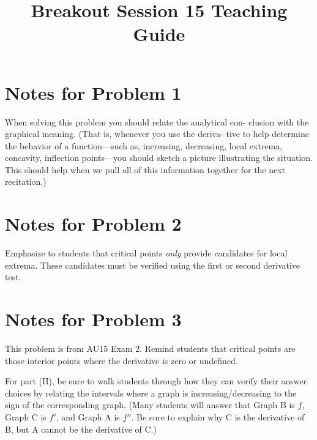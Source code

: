 \documentclass[nooutcomes]{ximera}
\title{Breakout Session 15 Teaching Guide}
\begin{document}
\begin{abstract}
\end{abstract}
\maketitle
\section{Notes for Problem 1}
When solving this problem you should relate the analytical con- clusion with the graphical meaning. (That is, whenever you use the deriva- tive to help determine the behavior of a function---such as, increasing, decreasing, local extrema, concavity, inflection points---you should sketch a picture illustrating the situation.
This should help when we pull all of this information together for the next recitation.)



\section{Notes for Problem 2}
Emphasize to students that critical points \emph{only} provide candidates for local extrema.
These candidates must be verified using the first or second derivative test.

\section{Notes for Problem 3}
This problem is from AU15 Exam 2.
Remind students that critical points are those interior points where the derivative is zero or undefined.

For part (II), be sure to walk students through how they can verify their answer choices by relating the intervals where a graph is increasing/decreasing to the sign of the corresponding graph.
(Many students will answer that Graph B is $f$, Graph C is $f'$, and Graph A is $f''$.
Be sure to explain why C is the derivative of B, but A cannot be the derivative of C.)
\end{document}
